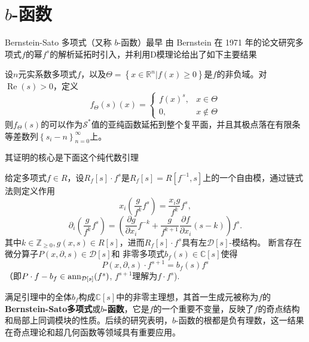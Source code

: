 \documentclass[12pt,a4paper]{ctexrep}   %
\begin{document}
\chapter{$b$-函数}
Bernstein-Sato 多项式（又称 \(b\)-函数）最早 由 Bernstein 在 1971 年的论文\cite{bernshtein1972analytic}研究多项式$f$的幂$f^s$的解析延拓时引入，并利用D模理论给出了如下主要结果
\begin{theorem}
    设$n$元实系数多项式$f$，以及$\Theta=\left\{x\in \mathbb{R}^n|f(x)\geq 0\right\}$是$f$的非负域。对$\operatorname{Re}(s)>0$，定义
    \begin{equation*}
        f_{\Theta}(s)(x)=\begin{cases}
            f(x)^s, & x\in \Theta    \\
            0,      & x\notin \Theta
        \end{cases}
    \end{equation*}
    则$f_{\Theta}(s)$的可以作为$\mathcal{S}^*$值的亚纯函数延拓到整个复平面，并且其极点落在有限条等差数列$\left\{s_i-n\right\}_{n=0}^{\infty}$上。
\end{theorem}
其证明的核心是下面这个纯代数引理
\begin{lemma}\label{b-function}
    给定多项式$f\in R$，设$R_f[s]\cdot f^s$是$R_f[s]=R[f^{-1},s]$上的一个自由模，通过链式法则定义作用
    \begin{equation*}
        x_i\left(\frac{g}{f^k}f^s\right)=\frac{x_ig}{f^k}f^s,
    \end{equation*}
    \begin{equation*}
        \partial_i\left(\frac{g}{f^k}f^s\right)
        =
        \left(\frac{\partial g}{\partial x_i}f^{-k}+\frac{g}{f^{k+1}}\frac{\partial f}{\partial x_i}(s-k)\right)f^s.
    \end{equation*}
    其中$k\in \mathbb{Z}_{\geq 0},g(x,s)\in R[s]$，进而$R_f[s]\cdot f^s$具有左$\mathcal{D}[s]$-模结构。
    断言存在
    微分算子$P(x,\partial,s)\in \mathcal{D}[s]$和
    非零多项式$b_f(s)\in \mathbb{C}[s]$使得
    \begin{equation*}
        P(x,\partial,s)\cdot f^{s+1} = b_f(s) f^{s}
    \end{equation*}
    （即$P\cdot f -b_f \in \operatorname{ann}_{\mathcal{D}[s]}(f^s)$, $f^{s+1}$理解为$f\cdot f^s$).
\end{lemma}
满足引理中的全体$b_f$构成$\mathbb{C}[s]$中的非零主理想，其首一生成元被称为$f$的\textbf{Bernstein-Sato多项式}或\textbf{$b$-函数}，它是$f$的一个重要不变量，反映了$f$的奇点结构和局部上同调模块的性质。后续的研究表明，$b$-函数的根都是负有理数，这一结果在奇点理论和超几何函数等领域具有重要应用。
\end{document}
